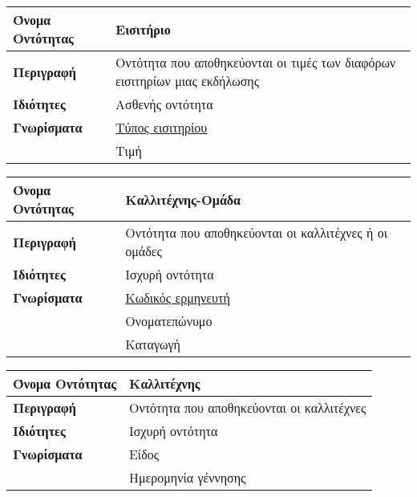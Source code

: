 \begin{center}
\begin{tabular}[]{|p{4cm}|p{10cm}|}
\hline
\textbf{Όνομα Οντότητας} & Εισιτήριο                            \\ \hline 
\textbf{Περιγραφή}       & Οντότητα που αποθηκεύονται οι τιμές των
                             διαφόρων εισιτηρίων μιας εκδήλωσης \\ \hline 
\textbf{Ιδιότητες}       & Ασθενής οντότητα                      \\ \hline               
\textbf{Γνωρίσματα}      & \underline{Τύπος εισιτηρίου}                     \\ \cline{2-2}
                         & Τιμή                                 \\ \hline
\end{tabular}

\vspace{0.3 cm}

\begin{tabular}[]{|p{4cm}|p{10cm}|}
\hline
\textbf{Όνομα Οντότητας} & Καλλιτέχνης-Ομάδα                         \\ \hline 
\textbf{Περιγραφή}       & Οντότητα που αποθηκεύονται οι καλλιτέχνες ή οι ομάδες \\ \hline 
\textbf{Ιδιότητες}       & Ισχυρή οντότητα                           \\    \hline           
\textbf{Γνωρίσματα}      & \underline{Κωδικός ερμηνευτή}             \\
                         & Ονοματεπώνυμο                             \\
           ~             & Καταγωγή                                  \\
\hline
\end{tabular}
\vspace{0.3 cm}

\begin{tabular}[]{|p{4cm}|p{10cm}|} 
 \hline
\textbf{Όνομα Οντότητας} & Καλλιτέχνης                               \\ \hline 
\textbf{Περιγραφή}       & Οντότητα που αποθηκεύονται οι καλλιτέχνες \\ \hline 
\textbf{Ιδιότητες}       & Ισχυρή  οντότητα
                                                                     \\ \hline          
\textbf{Γνωρίσματα}      & Είδος                                     \\
                         & Ημερομηνία γέννησης
                                                                     \\ \hline 
\end{tabular}
\vspace{0.3 cm}


\end{center}
